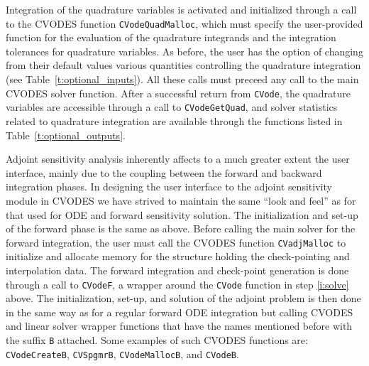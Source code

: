 Integration of the quadrature variables is activated and initialized through a 
call to the CVODES function {\tt CVodeQuadMalloc}, which must specify the
user-provided function for the evaluation of the quadrature integrands and
the integration tolerances for quadrature variables. As before, the user
has the option of changing from their default values various quantities
controlling the quadrature integration (see Table~\ref{t:optional_inputs}).
All these calls must preceed any call to the main CVODES solver function.
After a successful return from {\tt CVode}, the quadrature variables are
accessible through a call to {\tt CVodeGetQuad}, and solver statistics related
to quadrature integration are available through the functions listed in
Table~\ref{t:optional_outputs}.

%
Adjoint sensitivity analysis inherently affects to a much greater extent the 
user interface, mainly due to the coupling between the forward and backward 
integration phases. 
%
In designing the user interface to the adjoint sensitivity module in CVODES we 
have strived to maintain the same ``look and feel'' as for that used for
ODE and forward sensitivity solution.
The initialization and set-up of the forward phase is the same as above.
Before calling the main solver for the forward integration, the user must 
call the CVODES function {\tt CVadjMalloc} to initialize and allocate memory 
for the structure holding the check-pointing and interpolation data.
The forward integration and check-point generation is done through a call
to {\tt CVodeF}, a wrapper around the {\tt CVode} function in step 
\ref{i:solve} above.
%
The initialization, set-up, and solution of the adjoint problem is then
done in the same way as for a regular forward ODE integration but
calling CVODES and linear solver wrapper functions that have the names 
mentioned before with the suffix {\tt B} attached. Some examples of such
CVODES functions are: {\tt CVodeCreateB}, {\tt CVSpgmrB}, {\tt CVodeMallocB},
and {\tt CVodeB}.

